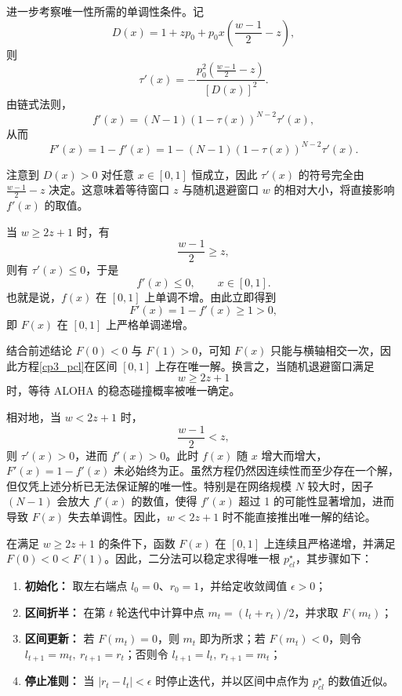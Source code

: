 进一步考察唯一性所需的单调性条件。记
\[
D(x)=1+zp_0+p_0x\left(\frac{w-1}{2}-z\right),
\]
则
\begin{equation}
    \tau'(x)= -\frac{p_0^2\left(\frac{w-1}{2}-z\right)}{[D(x)]^2}.
\end{equation}
由链式法则，
\begin{equation}
    f'(x)=(N-1)\left(1-\tau(x)\right)^{N-2}\tau'(x),
\end{equation}
从而
\begin{equation}
    F'(x)=1-f'(x)
    =1-(N-1)\left(1-\tau(x)\right)^{N-2}\tau'(x).
\end{equation}

注意到 $D(x)>0$ 对任意 $x\in[0,1]$ 恒成立，因此 $\tau'(x)$ 的符号完全由 $\frac{w-1}{2}-z$ 决定。这意味着等待窗口 $z$ 与随机退避窗口 $w$ 的相对大小，将直接影响 $f'(x)$ 的取值。

当 $w\ge 2z+1$ 时，有
\begin{equation}
    \frac{w-1}{2}\ge z,
\end{equation}
则有 $\tau'(x)\le 0$，于是
\begin{equation}
    f'(x)\le 0,\qquad x\in[0,1].
\end{equation}
也就是说，$f(x)$ 在 $[0,1]$ 上单调不增。由此立即得到
\begin{equation}
    F'(x)=1-f'(x)\ge 1>0,
\end{equation}
即 $F(x)$ 在 $[0,1]$ 上严格单调递增。

结合前述结论 $F(0)<0$ 与 $F(1)>0$，可知 $F(x)$ 只能与横轴相交一次，因此方程\eqref{cp3_pcl}在区间 $[0,1]$ 上存在唯一解。换言之，当随机退避窗口满足
\begin{equation}
    w\ge 2z+1
\end{equation}
时，等待 ALOHA 的稳态碰撞概率被唯一确定。

相对地，当 $w<2z+1$ 时，
\begin{equation}
    \frac{w-1}{2}<z,
\end{equation}
则 $\tau'(x)>0$，进而 $f'(x)>0$。此时 $f(x)$ 随 $x$ 增大而增大，$F'(x)=1-f'(x)$ 未必始终为正。虽然方程仍然因连续性而至少存在一个解，但仅凭上述分析已无法保证解的唯一性。特别是在网络规模 $N$ 较大时，因子 $(N-1)$ 会放大 $f'(x)$ 的数值，使得 $f'(x)$ 超过 1 的可能性显著增加，进而导致 $F(x)$ 失去单调性。因此，$w<2z+1$ 时不能直接推出唯一解的结论。

在满足 $w\ge 2z+1$ 的条件下，函数 $F(x)$ 在 $[0,1]$ 上连续且严格递增，并满足 $F(0)<0<F(1)$。因此，二分法可以稳定求得唯一根 $p_{cl}^\star$，其步骤如下：
\begin{enumerate}[wide]
    \item \textbf{初始化：} 取左右端点 $l_0=0$、$r_0=1$，并给定收敛阈值 $\epsilon>0$；
    \item \textbf{区间折半：} 在第 $t$ 轮迭代中计算中点 $m_t=(l_t+r_t)/2$，并求取 $F(m_t)$；
    \item \textbf{区间更新：} 若 $F(m_t)=0$，则 $m_t$ 即为所求；若 $F(m_t)<0$，则令 $l_{t+1}=m_t,\ r_{t+1}=r_t$；否则令 $l_{t+1}=l_t,\ r_{t+1}=m_t$；
    \item \textbf{停止准则：} 当 $|r_t-l_t|<\epsilon$ 时停止迭代，并以区间中点作为 $p_{cl}^\star$ 的数值近似。
\end{enumerate}

